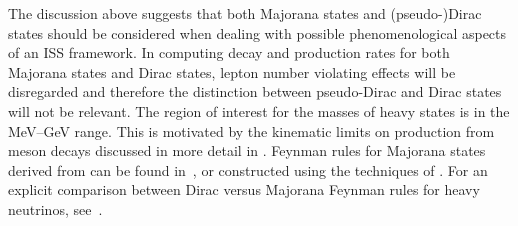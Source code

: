 

The discussion above suggests that both Majorana states and \mbox{(pseudo-)Dirac} states should be considered %
when dealing with possible phenomenological aspects of an ISS framework.
In computing decay and production rates for both Majorana states and Dirac states, %
lepton number violating effects will be disregarded and therefore the distinction between pseudo-Dirac %
and Dirac states will not be relevant.
The region of interest for the masses of heavy states is in the MeV--GeV range.
This is motivated by the kinematic limits on production from meson decays discussed in more detail in . %
Feynman rules for Majorana states derived from  can be found in~\cite{Atre:2009rg},
or constructed using the techniques of . 
For an explicit comparison between Dirac versus Majorana Feynman rules for heavy neutrinos, see~.




